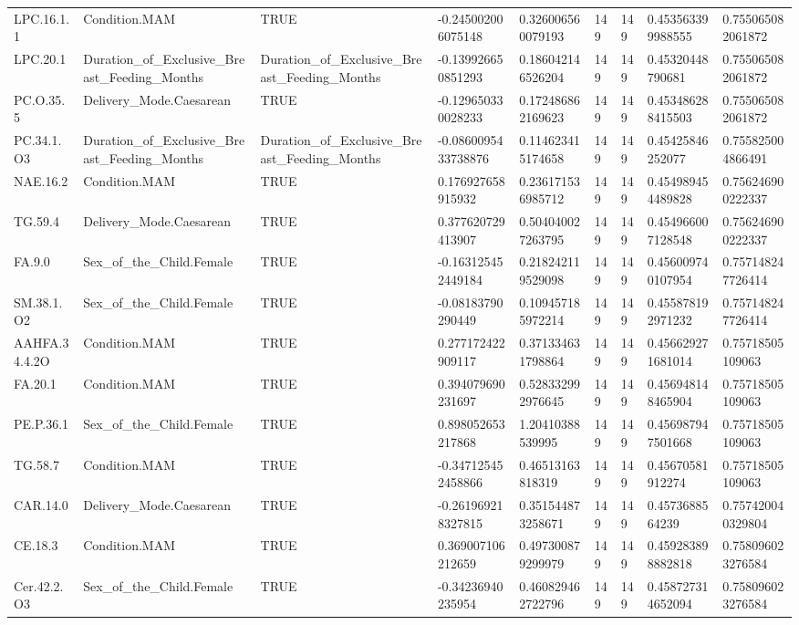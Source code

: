 \begin{longtable}{lllllllll}
LPC.16.1.1 & Condition.MAM & TRUE & -0.245002006075148 & 0.326006560079193 & 149 & 149 & 0.453563399988555 & 0.755065082061872 \\
LPC.20.1 & Duration\_of\_Exclusive\_Breast\_Feeding\_Months & Duration\_of\_Exclusive\_Breast\_Feeding\_Months & -0.139926650851293 & 0.186042146526204 & 149 & 149 & 0.45320448790681 & 0.755065082061872 \\
PC.O.35.5 & Delivery\_Mode.Caesarean & TRUE & -0.129650330028233 & 0.172486862169623 & 149 & 149 & 0.453486288415503 & 0.755065082061872 \\
PC.34.1.O3 & Duration\_of\_Exclusive\_Breast\_Feeding\_Months & Duration\_of\_Exclusive\_Breast\_Feeding\_Months & -0.0860095433738876 & 0.114623415174658 & 149 & 149 & 0.45425846252077 & 0.755825004866491 \\
NAE.16.2 & Condition.MAM & TRUE & 0.176927658915932 & 0.236171536985712 & 149 & 149 & 0.454989454489828 & 0.756246900222337 \\
TG.59.4 & Delivery\_Mode.Caesarean & TRUE & 0.377620729413907 & 0.504040027263795 & 149 & 149 & 0.454966007128548 & 0.756246900222337 \\
FA.9.0 & Sex\_of\_the\_Child.Female & TRUE & -0.163125452449184 & 0.218242119529098 & 149 & 149 & 0.456009740107954 & 0.757148247726414 \\
SM.38.1.O2 & Sex\_of\_the\_Child.Female & TRUE & -0.08183790290449 & 0.109457185972214 & 149 & 149 & 0.455878192971232 & 0.757148247726414 \\
AAHFA.34.4.2O & Condition.MAM & TRUE & 0.277172422909117 & 0.371334631798864 & 149 & 149 & 0.456629271681014 & 0.75718505109063 \\
FA.20.1 & Condition.MAM & TRUE & 0.394079690231697 & 0.528332992976645 & 149 & 149 & 0.456948148465904 & 0.75718505109063 \\
PE.P.36.1 & Sex\_of\_the\_Child.Female & TRUE & 0.898052653217868 & 1.20410388539995 & 149 & 149 & 0.456987947501668 & 0.75718505109063 \\
TG.58.7 & Condition.MAM & TRUE & -0.347125452458866 & 0.46513163818319 & 149 & 149 & 0.45670581912274 & 0.75718505109063 \\
CAR.14.0 & Delivery\_Mode.Caesarean & TRUE & -0.261969218327815 & 0.351544873258671 & 149 & 149 & 0.4573688564239 & 0.757420040329804 \\
CE.18.3 & Condition.MAM & TRUE & 0.369007106212659 & 0.497300879299979 & 149 & 149 & 0.459283898882818 & 0.758096023276584 \\
Cer.42.2.O3 & Sex\_of\_the\_Child.Female & TRUE & -0.34236940235954 & 0.460829462722796 & 149 & 149 & 0.458727314652094 & 0.758096023276584 \\

\end{longtable}
